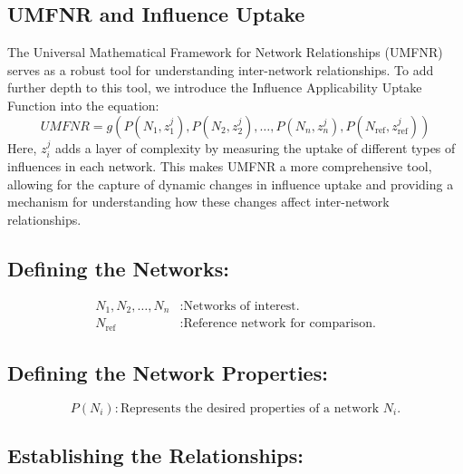 \documentclass[sn-nature]{sn-jnl}%
\theoremstyle{thmstyleone}%
\theoremstyle{thmstyletwo}%
\theoremstyle{thmstylethree}%
\begin{document}
\subsection{UMFNR and Influence Uptake}
The Universal Mathematical Framework for Network Relationships (UMFNR) serves as a robust tool for understanding inter-network relationships. To add further depth to this tool, we introduce the Influence Applicability Uptake Function into the equation:
\begin{equation}
UMFNR = g(P(N_1, z_1^j), P(N_2, z_2^j), \ldots, P(N_n, z_n^j), P(N_{\text{ref}}, z_{\text{ref}}^j))
\end{equation}
Here, \( z_i^j \) adds a layer of complexity by measuring the uptake of different types of influences in each network. This makes UMFNR a more comprehensive tool, allowing for the capture of dynamic changes in influence uptake and providing a mechanism for understanding how these changes affect inter-network relationships.


\subsection*{Defining the Networks:}
\begin{align*}
N_1, N_2, \dots, N_n & : \text{Networks of interest.} \\
N_{\text{ref}} & : \text{Reference network for comparison.}
\end{align*}

\subsection*{Defining the Network Properties:}
\[
P(N_i) : \text{Represents the desired properties of a network } N_i.
\]

\subsection*{Establishing the Relationships:}
\end{document}
